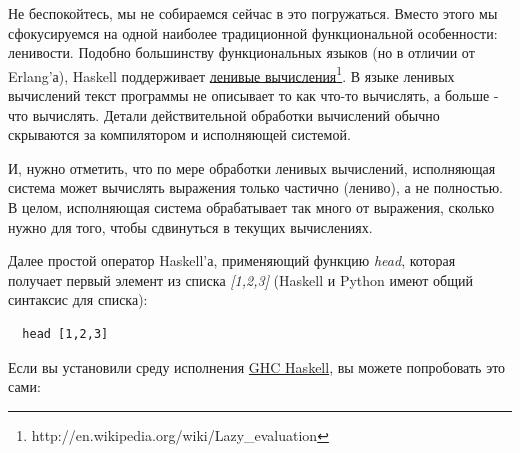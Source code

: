 Не беспокойтесь, мы не собираемся сейчас в это погружаться. 
Вместо этого мы сфокусируемся на одной наиболее 
традиционной функциональной особенности: ленивости. Подобно 
большинству функциональных языков (но в отличии от Erlang'а), Haskell 
поддерживает \href{http://en.wikipedia.org/wiki/Lazy\_evaluation}{ленивые вычисления}\footnote[5]{http://en.wikipedia.org/wiki/Lazy\_evaluation}. 
В языке ленивых вычислений текст программы не описывает то как 
что-то вычислять, а больше - что вычислять. Детали действительной 
обработки вычислений обычно скрываются за компилятором и исполняющей системой.


И, нужно отметить, что по мере обработки ленивых вычислений, 
исполняющая система может вычислять выражения только частично (лениво), 
а не полностью. В целом, исполняющая система обрабатывает так много от 
выражения, сколько нужно для того, чтобы сдвинуться в текущих вычислениях. 


Далее простой оператор Haskell'а, применяющий 
функцию \textit{head}, которая получает первый элемент из списка \textit{[1,2,3]} (Haskell и 
Python имеют общий синтаксис для списка): 

\begin{scriptsize}\begin{verbatim}
  head [1,2,3]
\end{verbatim}\end{scriptsize}


Если вы установили среду исполнения 
\href{http://www.haskell.org/ghc/}{GHC Haskell}, вы можете 
попробовать это сами:

